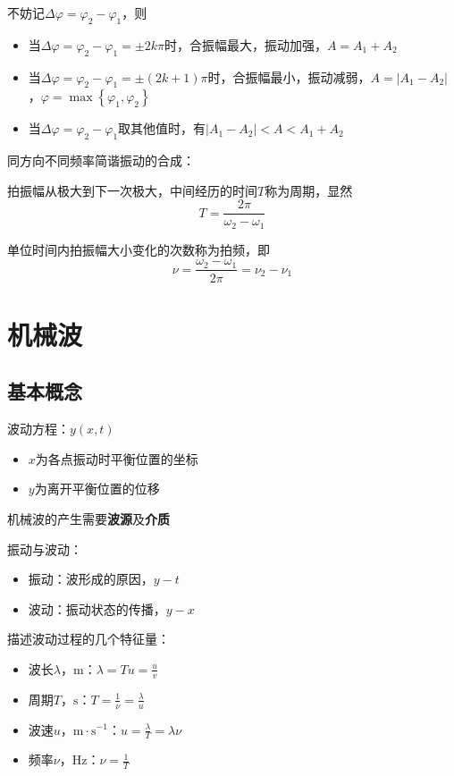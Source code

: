 \documentclass[12pt, a4paper, twoside]{ctexbook}
\begin{document}
不妨记$\Delta\varphi=\varphi_2-\varphi_1$，则
\begin{itemize}
    \item 当$\Delta\varphi=\varphi_2-\varphi_1=\pm 2k\pi$时，合振幅最大，振动加强，$A=A_1+A_2$
    \item 当$\Delta\varphi=\varphi_2-\varphi_1=\pm\left(2k+1\right)\pi$时，合振幅最小，振动减弱，$A=\left|A_1-A_2\right|$，$\varphi=\max\left\{\varphi_1,\varphi_2\right\}$
    \item 当$\Delta\varphi=\varphi_2-\varphi_1$取其他值时，有$\left|A_1-A_2\right|<A<A_1+A_2$
\end{itemize}

{\sonti 同方向不同频率简谐振动的合成}：

拍振幅从极大到下一次极大，中间经历的时间$T$称为周期，显然
$$
T=\frac{2\pi}{\omega_2-\omega_1}
$$

单位时间内拍振幅大小变化的次数称为拍频，即
$$
\nu=\frac{\omega_2-\omega_1}{2\pi}=\nu_2-\nu_1
$$
\chapter{机械波}
\newpage
\section{基本概念}
{\sonti 波动方程}：$y\left(x,t\right)$
\begin{itemize}
    \item $x$为各点振动时平衡位置的坐标
    \item $y$为离开平衡位置的位移
\end{itemize}

{\sonti 机械波}的产生需要\textbf{波源}及\textbf{介质}

{\sonti 振动与波动}：
\begin{itemize}
    \item 振动：波形成的原因，$y-t$
    \item 波动：振动状态的传播，$y-x$
\end{itemize}

{\sonti 描述波动过程的几个特征量}：
\begin{itemize}
    \item 波长$\lambda$，$\mathrm{m}$：$\lambda=Tu=\frac{u}{v}$
    \item 周期$T$，$\mathrm{s}$：$T=\frac{1}{\nu}=\frac{\lambda}{u}$
    \item 波速$u$，$\mathrm{m}\cdot\mathrm{s}^{-1}$：$u=\frac{\lambda}{T}=\lambda\nu$
    \item 频率$\nu$，$\mathrm{Hz}$：$\nu=\frac{1}{T}$
\end{itemize}
\end{document}
